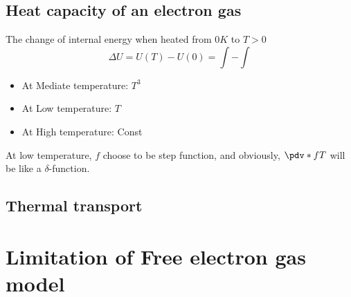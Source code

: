 \subsection{Heat capacity of an electron gas}

The change of internal energy when heated from $0K$ to $T > 0$
\begin{equation}
  \Delta U = U(T) - U(0) = \int - \int 
\end{equation}

\begin{itemize}
  \item At Mediate temperature: $T^3$
  \item At Low temperature: $T$
  \item At High temperature: Const
\end{itemize}

At low temperature, $f$ choose to be step function, and obviously,
$\pdv* fT$ will be like a $\delta$-function.

\subsection{Thermal transport}

\section{Limitation of Free electron gas model}

